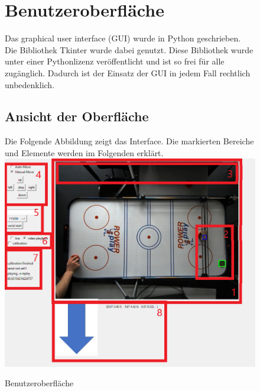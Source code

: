 \clearpage
\begin{figure}
\section{Benutzeroberfläche}
\label{sect:gui}
Das graphical user interface (GUI) wurde in Python geschrieben. Die Bibliothek Tkinter wurde dabei genutzt. Diese Bibliothek wurde unter einer Pythonlizenz veröffentlicht und ist so frei für alle zugänglich. Dadurch ist der Einsatz der GUI in jedem Fall rechtlich unbedenklich.\\

\subsection{Ansicht der Oberfläche}
\label{subsect:gui_pic}


Die Folgende Abbildung zeigt das Interface. Die markierten Bereiche und Elemente werden im Folgenden erklärt.\\
\includegraphics[width=\textwidth]{images/gui_pic_marked}
 \caption{Benutzeroberfläche}
 \label{gui_pic}

\end{figure}
